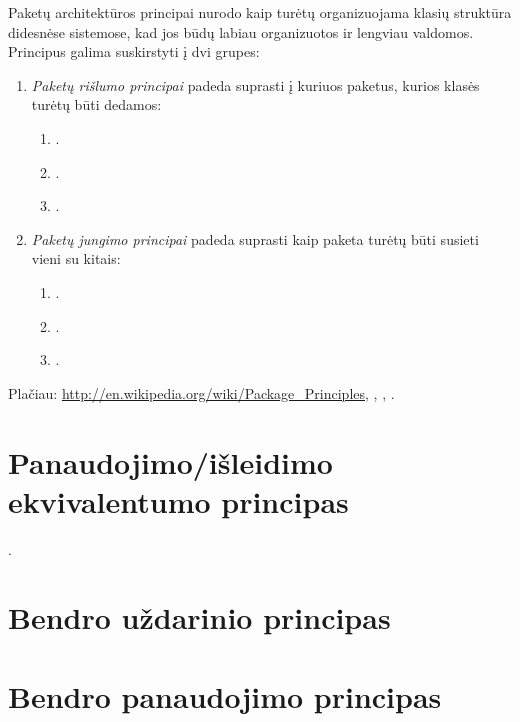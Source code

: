 
Paketų architektūros principai nurodo kaip turėtų organizuojama klasių
struktūra didesnėse sistemose, kad jos būdų labiau organizuotos
ir lengviau valdomos. Principus galima suskirstyti į dvi grupes:
\begin{enumerate}
  \item \emph{Paketų rišlumo principai} padeda suprasti į kuriuos
    paketus, kurios klasės turėtų būti dedamos:
    \begin{enumerate}
      \item {}.
      \item {}.
      \item {}.
    \end{enumerate}
  \item \emph{Paketų jungimo principai} padeda suprasti kaip paketa
    turėtų būti susieti vieni su kitais:
    \begin{enumerate}
      \item {}.
      \item {}.
      \item {}.
    \end{enumerate}
\end{enumerate}

Plačiau: \url{http://en.wikipedia.org/wiki/Package\_Principles},
\cite{martin2000design}, \cite{martin1995designing},
\cite{martin2003agile}.

\section{Panaudojimo/išleidimo ekvivalentumo principas}

\label{section:package:rep}

.

\section{Bendro uždarinio principas}

\label{section:package:ccp}


\section{Bendro panaudojimo principas}

